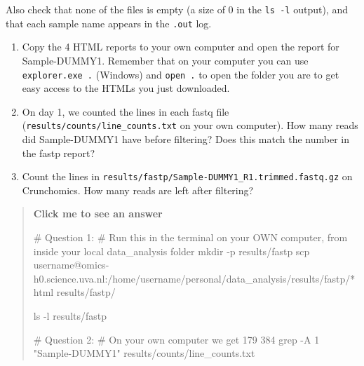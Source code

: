 \documentclass[
  letterpaper,
  DIV=11,
  numbers=noendperiod]{scrreprt}
\newenvironment{Shaded}{}{}
\newcommand{\AttributeTok}[1]{\textcolor[rgb]{0.84,0.23,0.29}{#1}}
\newcommand{\CommentTok}[1]{\textcolor[rgb]{0.42,0.45,0.49}{#1}}
\newcommand{\FunctionTok}[1]{\textcolor[rgb]{0.44,0.26,0.76}{#1}}
\newcommand{\NormalTok}[1]{\textcolor[rgb]{0.14,0.16,0.18}{#1}}
\newcommand{\StringTok}[1]{\textcolor[rgb]{0.01,0.18,0.38}{#1}}
\providecommand{\tightlist}{%
  \setlength{\itemsep}{0pt}\setlength{\parskip}{0pt}}
\begin{document}
Also check that none of the files is empty (a size of 0 in the
\texttt{ls\ -l} output), and that each sample name appears in the
\texttt{.out} log.

\begin{tcolorbox}[enhanced jigsaw, colbacktitle=quarto-callout-color!10!white, rightrule=.15mm, leftrule=.75mm, colback=white, opacitybacktitle=0.6, title=\textcolor{quarto-callout-color}{\faInfo}\hspace{0.5em}{Exercise}, bottomrule=.15mm, left=2mm, colframe=quarto-callout-color-frame, opacityback=0, breakable, bottomtitle=1mm, coltitle=black, arc=.35mm, toprule=.15mm, toptitle=1mm, titlerule=0mm]

\begin{enumerate}
\def\labelenumi{\arabic{enumi}.}
\tightlist
\item
  Copy the 4 HTML reports to your own computer and open the report for
  Sample-DUMMY1. Remember that on your computer you can use
  \texttt{explorer.exe\ .} (Windows) and \texttt{open\ .} to open the
  folder you are to get easy access to the HTMLs you just downloaded.
\item
  On day 1, we counted the lines in each fastq file
  (\texttt{results/counts/line\_counts.txt} on your own computer). How
  many reads did Sample-DUMMY1 have before filtering? Does this match
  the number in the fastp report?
\item
  Count the lines in
  \texttt{results/fastp/Sample-DUMMY1\_R1.trimmed.fastq.gz} on
  Crunchomics. How many reads are left after filtering?
\end{enumerate}

\begin{quote}
\textbf{Click me to see an answer}

\begin{Shaded}
\begin{Highlighting}[]
\CommentTok{\# Question 1:}
\CommentTok{\# Run this in the terminal on your OWN computer, from inside your local data\_analysis folder}
\FunctionTok{mkdir} \AttributeTok{{-}p}\NormalTok{ results/fastp}
\FunctionTok{scp} \StringTok{\textquotesingle{}username@omics{-}h0.science.uva.nl:/home/username/personal/data\_analysis/results/fastp/*html\textquotesingle{}}\NormalTok{ results/fastp/}

\FunctionTok{ls} \AttributeTok{{-}l}\NormalTok{ results/fastp}

\CommentTok{\# Question 2:}
\CommentTok{\# On your own computer we get 179 384}
\FunctionTok{grep} \AttributeTok{{-}A}\NormalTok{ 1 }\StringTok{"Sample{-}DUMMY1"}\NormalTok{ results/counts/line\_counts.txt}


\end{Highlighting}
\end{Shaded}
\end{quote}
\end{tcolorbox}
\end{document}

